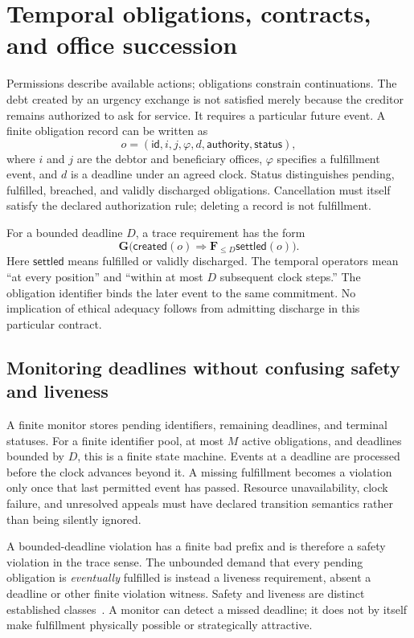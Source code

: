 \section{Temporal obligations, contracts, and office succession}\label{MS:sec:obligations}
Permissions describe available actions; obligations constrain continuations. The debt created by an urgency exchange is not satisfied merely because the creditor remains authorized to ask for service. It requires a particular future event. A finite obligation record can be written as
\[
o=(\mathsf{id},i,j,\varphi,d,\mathsf{authority},\mathsf{status}),
\]
where $i$ and $j$ are the debtor and beneficiary offices, $\varphi$ specifies a fulfillment event, and $d$ is a deadline under an agreed clock. Status distinguishes pending, fulfilled, breached, and validly discharged obligations. Cancellation must itself satisfy the declared authorization rule; deleting a record is not fulfillment.

For a bounded deadline $D$, a trace requirement has the form
\[
\mathbf G\bigl(\mathsf{created}(o)\Rightarrow
\mathbf F_{\leq D}\mathsf{settled}(o)\bigr).
\]
Here $\mathsf{settled}$ means fulfilled or validly discharged. The temporal operators mean ``at every position'' and ``within at most $D$ subsequent clock steps.'' The obligation identifier binds the later event to the same commitment. No implication of ethical adequacy follows from admitting discharge in this particular contract.

\subsection{Monitoring deadlines without confusing safety and liveness}
A finite monitor stores pending identifiers, remaining deadlines, and terminal statuses. For a finite identifier pool, at most $M$ active obligations, and deadlines bounded by $D$, this is a finite state machine. Events at a deadline are processed before the clock advances beyond it. A missing fulfillment becomes a violation only once that last permitted event has passed. Resource unavailability, clock failure, and unresolved appeals must have declared transition semantics rather than being silently ignored.

A bounded-deadline violation has a finite bad prefix and is therefore a safety violation in the trace sense. The unbounded demand that every pending obligation is \emph{eventually} fulfilled is instead a liveness requirement, absent a deadline or other finite violation witness. Safety and liveness are distinct established classes~\cite{MS:alpern}. A monitor can detect a missed deadline; it does not by itself make fulfillment physically possible or strategically attractive.

